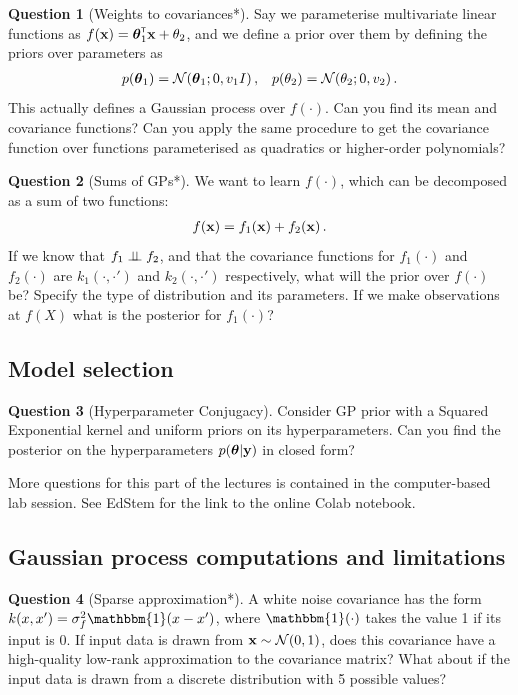 \documentclass[a4paper]{article}
\theoremstyle{definition}
\newtheorem{question}{Question}
\begin{document}
\begin{question}[Weights to covariances*]
\label{q:weights}
Say we parameterise multivariate linear functions as $f(\mathbf{x}) = \boldsymbol{\theta}_1^\mathrm{\textsf{\tiny T}}\mathbf{x} + \theta_2$, and we define a prior over them by defining the priors over parameters as
\begin{align}
p(\vtheta_1) = \NormDist{\vtheta_1; 0, v_1 I}\,, && p(\theta_2) = \NormDist{\theta_2; 0, v_2} \,.
\end{align}
This actually defines a Gaussian process over $f(\cdot)$. Can you find its mean and covariance functions? Can you apply the same procedure to get the covariance function over functions parameterised as quadratics or higher-order polynomials?
\end{question}


\begin{question}[Sums of GPs*]
\label{q:gp-sum}
We want to learn $f(\cdot)$, which can be decomposed as a sum of two functions:
\begin{align}
f(\mathbf{x}) = f_1(\mathbf{x}) + f_2(\mathbf{x})\,.
\end{align}
If we know that $f_1 \perp\!\!\!\perp f_2$, and that the covariance functions for $f_1(\cdot)$ and $f_2(\cdot)$ are $k_1(\cdot, \cdot')$ and $k_2(\cdot, \cdot')$ respectively, what will the prior over $f(\cdot)$ be? Specify the type of distribution and its parameters. If we make observations at $f(X)$ what is the posterior for $f_1(\cdot)$?
\end{question}




\subsection{Model selection}
\begin{question}[Hyperparameter Conjugacy]
\label{q:gp-hyper-conj}
Consider GP prior with a Squared Exponential kernel and uniform priors on its hyperparameters. Can you find the posterior on the hyperparameters $p(\boldsymbol{\theta}|\mathbf{y})$ in closed form?
\end{question}
More questions for this part of the lectures is contained in the computer-based lab session. See EdStem for the link to the online Colab notebook.


\subsection{Gaussian process computations and limitations}
\begin{question}[Sparse approximation*]
\label{q:sparse-approx}
A white noise covariance has the form $k(x, x') = \sigma^2_f\mathbbm{1}\left(x - x'\right)$, where $\mathbbm{1}(\cdot)$ takes the value 1 if its input is 0. If input data is drawn from $\vx \sim \NormDist{0, 1}$, does this covariance have a high-quality low-rank approximation to the covariance matrix? What about if the input data is drawn from a discrete distribution with 5 possible values?
\end{question}
\end{document}

